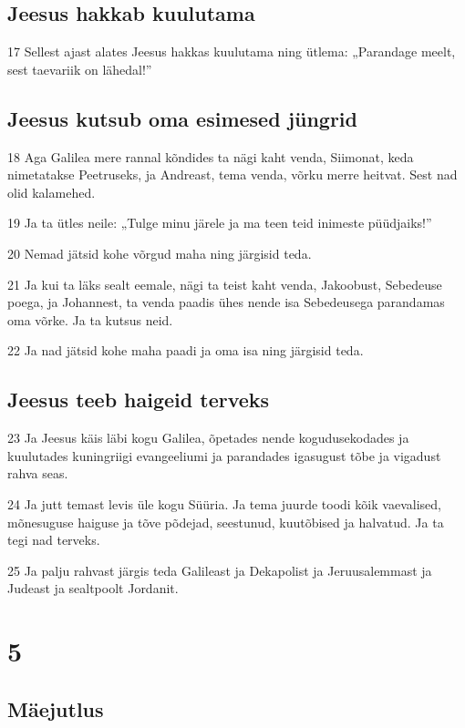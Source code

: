 \section*{Jeesus hakkab kuulutama}

\par 17 Sellest ajast alates Jeesus hakkas kuulutama ning ütlema: „Parandage meelt, sest taevariik on lähedal!”

\section*{Jeesus kutsub oma esimesed jüngrid}

\par 18 Aga Galilea mere rannal kõndides ta nägi kaht venda, Siimonat, keda nimetatakse Peetruseks, ja Andreast, tema venda, võrku merre heitvat. Sest nad olid kalamehed.
\par 19 Ja ta ütles neile: „Tulge minu järele ja ma teen teid inimeste püüdjaiks!”
\par 20 Nemad jätsid kohe võrgud maha ning järgisid teda.
\par 21 Ja kui ta läks sealt eemale, nägi ta teist kaht venda, Jakoobust, Sebedeuse poega, ja Johannest, ta venda paadis ühes nende isa Sebedeusega parandamas oma võrke. Ja ta kutsus neid.
\par 22 Ja nad jätsid kohe maha paadi ja oma isa ning järgisid teda.

\section*{Jeesus teeb haigeid terveks}

\par 23 Ja Jeesus käis läbi kogu Galilea, õpetades nende kogudusekodades ja kuulutades kuningriigi evangeeliumi ja parandades igasugust tõbe ja vigadust rahva seas.
\par 24 Ja jutt temast levis üle kogu Süüria. Ja tema juurde toodi kõik vaevalised, mõnesuguse haiguse ja tõve põdejad, seestunud, kuutõbised ja halvatud. Ja ta tegi nad terveks.
\par 25 Ja palju rahvast järgis teda Galileast ja Dekapolist ja Jeruusalemmast ja Judeast ja sealtpoolt Jordanit.


\chapter{5}

\section*{Mäejutlus}

